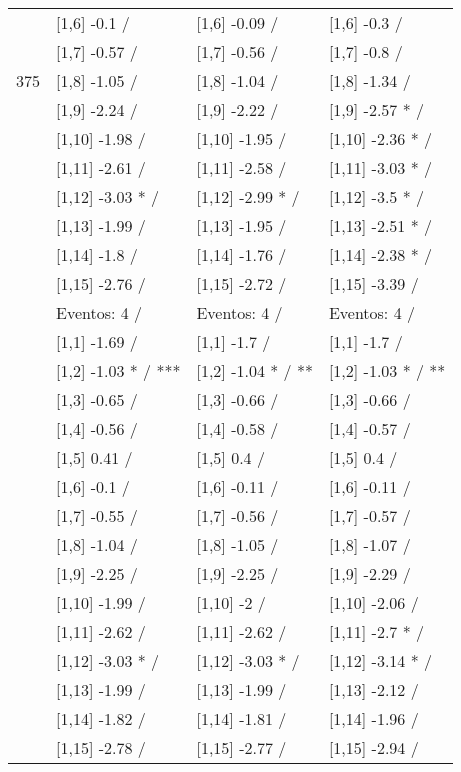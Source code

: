 \begin{table}
\begin{tabular}[t]{llll}
 & {}[1,6] -0.1  / & {}[1,6] -0.09  / & {}[1,6] -0.3  /\\
 & {}[1,7] -0.57  / & {}[1,7] -0.56  / & {}[1,7] -0.8  /\\
375 & {}[1,8] -1.05  / & {}[1,8] -1.04  / & {}[1,8] -1.34  /\\
\addlinespace
 & {}[1,9] -2.24  / & {}[1,9] -2.22  / & {}[1,9] -2.57 * /\\
 & {}[1,10] -1.98  / & {}[1,10] -1.95  / & {}[1,10] -2.36 * /\\
 & {}[1,11] -2.61  / & {}[1,11] -2.58  / & {}[1,11] -3.03 * /\\
 & {}[1,12] -3.03 * / & {}[1,12] -2.99 * / & {}[1,12] -3.5 * /\\
 & {}[1,13] -1.99  / & {}[1,13] -1.95  / & {}[1,13] -2.51 * /\\
\addlinespace
 & {}[1,14] -1.8  / & {}[1,14] -1.76  / & {}[1,14] -2.38 * /\\
 & {}[1,15] -2.76  / & {}[1,15] -2.72  / & {}[1,15] -3.39  /\\
 & Eventos:  4 / & Eventos:  4 / & Eventos:  4 /\\
 & {}[1,1] -1.69  / & {}[1,1] -1.7  / & {}[1,1] -1.7  /\\
 & {}[1,2] -1.03 * / *** & {}[1,2] -1.04 * / ** & {}[1,2] -1.03 * / **\\
\addlinespace
 & {}[1,3] -0.65  / & {}[1,3] -0.66  / & {}[1,3] -0.66  /\\
 & {}[1,4] -0.56  / & {}[1,4] -0.58  / & {}[1,4] -0.57  /\\
 & {}[1,5] 0.41  / & {}[1,5] 0.4  / & {}[1,5] 0.4  /\\
 & {}[1,6] -0.1  / & {}[1,6] -0.11  / & {}[1,6] -0.11  /\\
 & {}[1,7] -0.55  / & {}[1,7] -0.56  / & {}[1,7] -0.57  /\\
\addlinespace
500 & {}[1,8] -1.04  / & {}[1,8] -1.05  / & {}[1,8] -1.07  /\\
 & {}[1,9] -2.25  / & {}[1,9] -2.25  / & {}[1,9] -2.29  /\\
 & {}[1,10] -1.99  / & {}[1,10] -2  / & {}[1,10] -2.06  /\\
 & {}[1,11] -2.62  / & {}[1,11] -2.62  / & {}[1,11] -2.7 * /\\
 & {}[1,12] -3.03 * / & {}[1,12] -3.03 * / & {}[1,12] -3.14 * /\\
\addlinespace
 & {}[1,13] -1.99  / & {}[1,13] -1.99  / & {}[1,13] -2.12  /\\
 & {}[1,14] -1.82  / & {}[1,14] -1.81  / & {}[1,14] -1.96  /\\
 & {}[1,15] -2.78  / & {}[1,15] -2.77  / & {}[1,15] -2.94  /\\
\bottomrule
\end{tabular}
\end{table}
